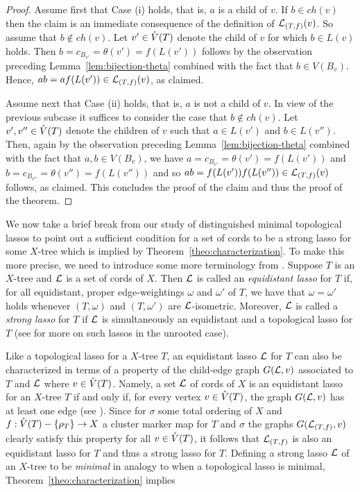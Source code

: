 \begin{proof}
Assume first that Case (i) holds, that is, $a$ is a child of $v$.
If $b\in ch(v)$ then the claim is an immediate consequence 
of the definition of ${\mathcal L}_{(T,f)}(v)$. So assume that 
$b\not\in ch(v)$. Let $v'\in \mathring{V}(T)$ denote the child of $v$ for which
$b\in L(v)$ holds. Then $b=c_{B_{v'}}=\theta(v')=f(L(v'))$ follows by the 
observation preceding Lemma~\ref{lem:bijection-theta} combined 
with the fact that $b\in V(B_v)$. Hence,
$ab=af(L(v'))\in {\mathcal L}_{(T,f)}(v)$, as claimed.

Assume next that Case (ii) holds, that is, $a$ is not a child of $v$.
In view of the previous subcase it suffices to consider the case that 
$b\not\in ch(v)$. Let $v',v''\in \mathring{V}(T)$ denote the
children of $v$ such that $a\in L(v')$ and $b\in L(v'')$. 
Then, again by the 
observation preceding Lemma~\ref{lem:bijection-theta} 
combined with the fact that $a,b\in V(B_v)$, we have
$a=c_{B_{v'}}=\theta(v')=f(L(v'))$ 
and $b=c_{B_{v''}}=\theta(v'')=f(L(v''))$ and so
$ab=f(L(v'))f(L(v''))\in {\mathcal L}_{(T,f)}(v)$ follows, as claimed.
 This concludes the proof
of the claim and thus the proof of the theorem.
\qquad 
\end{proof}

We now take a brief break from our study of distinguished minimal 
topological lassos to point out a sufficient condition
for a set of cords to be a strong lasso for some 
$X$-tree which is implied
by Theorem~\ref{theo:characterization}. To make this
more precise, we need to introduce some more terminology
from \cite{HP13}. Suppose $T$ is an $X$-tree and  
${\mathcal L}$ is a set of cords of $X$.
Then ${\mathcal L}$ is called an {\em equidistant lasso} for $T$ if, for all 
equidistant, proper edge-weightings $\omega$ and $\omega'$ of
$T$, we have that $\omega=\omega'$ holds whenever
$(T,\omega)$ and $(T,\omega')$ are ${\mathcal L}$-isometric. Moreover, ${\mathcal L}$
is called a {\em strong lasso} for $T$ if ${\mathcal L}$  is simultaneously
an equidistant and a topological lasso for $T$ (see 
\cite{DHS11} for more
on such lassos in the unrooted case). 

Like a topological lasso for a $X$-tree $T$,
an equidistant lasso ${\mathcal L}$ for $T$ 
can also be characterized in terms of a property of the 
child-edge graph $G({\mathcal L},v)$ associated to $T$ and ${\mathcal L}$
where $v\in \mathring{V}(T)$. Namely, a set 
${\mathcal L}$ of cords of $X$ is an equidistant lasso for an $X$-tree $T$
if and only if, for every vertex $v\in \mathring{V}(T)$, the graph
$G({\mathcal L},v)$ has at least one edge (see \cite[Theorem 6.1]{HP13}).
Since for $\sigma$ some total ordering of $X$ and
$f:\mathring{V}(T)-\{\rho_T\}\to X$ a cluster marker map for $T$ and $\sigma$
the graphs $G({\mathcal L}_{(T,f)},v)$ clearly satisfy this property
for all $v\in \mathring{V}(T)$, it follows that ${\mathcal L}_{(T,f)}$ is also
an equidistant lasso for $T$ and thus a strong lasso for $T$. Defining 
a strong lasso ${\mathcal L}$ of an $X$-tree  to be {\em minimal} in analogy 
to when a topological lasso is minimal, 
Theorem~\ref{theo:characterization} implies



